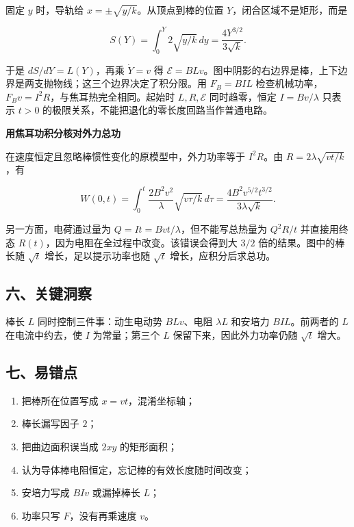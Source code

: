 \documentclass[12pt,a4paper,UTF8]{ctexart}
\newcommand{\tightlist}{\setlength{\itemsep}{0pt}\setlength{\parskip}{0pt}}
\begin{document}
固定 \(y\) 时，导轨给 \(x=\pm\sqrt{y/k}\)。从顶点到棒的位置
\(Y\)，闭合区域不是矩形，而是

\[S(Y)=\int_0^Y2\sqrt{y/k}\,dy=\frac{4Y^{3/2}}{3\sqrt k}.\]

于是 \(dS/dY=L(Y)\)，再乘 \(\dot Y=v\) 得
\(\mathcal E=BLv\)。图中阴影的右边界是棒，上下边界是两支抛物线；这三个边界决定了积分限。用
\(F_B=BIL\) 检查机械功率，\(F_Bv=I^2R\)，与焦耳热完全相同。起始时
\(L,R,\mathcal E\) 同时趋零，恒定 \(I=Bv/\lambda\) 只表示 \(t>0\)
的极限关系，不能把退化的零长度回路当作普通电路。

\textbf{用焦耳功积分核对外力总功}

在速度恒定且忽略棒惯性变化的原模型中，外力功率等于 \(I^2R\)。由
\(R=2\lambda\sqrt{vt/k}\)，有

\[W(0,t)=\int_0^t\frac{2B^2v^2}{\lambda}\sqrt{v\tau/k}\,d\tau=\frac{4B^2v^{5/2}t^{3/2}}{3\lambda\sqrt k}.\]

另一方面，电荷通过量为 \(Q=It=Bvt/\lambda\)，但不能写总热量为 \(Q^2R/t\)
并直接用终态 \(R(t)\)，因为电阻在全过程中改变。该错误会得到大 \(3/2\)
倍的结果。图中的棒长随 \(\sqrt t\) 增长，足以提示功率也随 \(\sqrt t\)
增长，应积分后求总功。

\subsection{六、关键洞察}\label{ux516dux5173ux952eux6d1eux5bdf-3}

棒长 \(L\) 同时控制三件事：动生电动势 \(BLv\)、电阻 \(\lambda L\)
和安培力 \(BIL\)。前两者的 \(L\) 在电流中约去，使 \(I\) 为常量；第三个
\(L\) 保留下来，因此外力功率仍随 \(\sqrt t\) 增大。

\subsection{七、易错点}\label{ux4e03ux6613ux9519ux70b9-3}

\begin{enumerate}
\def\labelenumi{\arabic{enumi}.}
\tightlist
\item
  把棒所在位置写成 \(x=vt\)，混淆坐标轴；
\item
  棒长漏写因子 \(2\)；
\item
  把曲边面积误当成 \(2xy\) 的矩形面积；
\item
  认为导体棒电阻恒定，忘记棒的有效长度随时间改变；
\item
  安培力写成 \(BIv\) 或漏掉棒长 \(L\)；
\item
  功率只写 \(F\)，没有再乘速度 \(v\)。
\end{enumerate}
\end{document}

